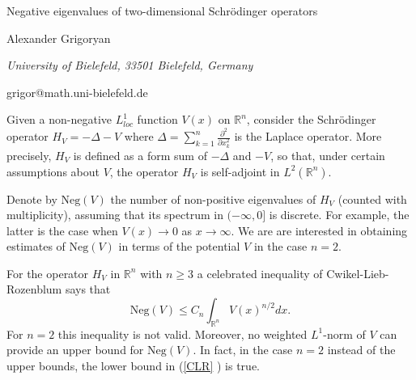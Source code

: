 \documentclass[10pt,a4paper]{article}
\begin{document}
\begin{center}
{\Large Negative eigenvalues of two-dimensional Schr\"{o}dinger operators}

\bigskip

{\sc Alexander Grigoryan}

{\small\it University of Bielefeld, 33501 Bielefeld, Germany}

{\small\rm grigor@math.uni-bielefeld.de}

\end{center}

\bigskip

Given a non-negative $L_{loc}^{1}$ function $V\left( x\right) $ on $\mathbb{R%
}^{n}$, consider the Schr\"{o}dinger operator
$
H_{V}=-\Delta -V
$
where $\Delta =\sum_{k=1}^{n}\frac{\partial ^{2}}{\partial x_{k}^{2}}$ is
the Laplace operator. More precisely, $H_{V}$ is defined as a form sum of $%
-\Delta $ and $-V$, so that, under certain assumptions about $V$, the
operator $H_{V}$ is self-adjoint in $L^{2}\left( \mathbb{R}^{n}\right) $.

Denote by $\mathrm{Neg}\left( V\right) $ the number of non-positive
eigenvalues of $H_{V}$ (counted with multiplicity), assuming that its
spectrum in $(-\infty ,0]$ is discrete. For example, the latter is the case
when $V\left( x\right) \rightarrow 0$ as $x\rightarrow \infty $. We are are
interested in obtaining estimates of $\mathrm{Neg}\left( V\right) $ in terms
of the potential $V$ in the case $n=2.$

For the operator $H_{V}$ in $\mathbb{R}^{n}$ with $n\geq 3$ a celebrated
inequality of Cwikel-Lieb-Rozenblum says that%
\begin{equation}
\mathrm{Neg}\left( V\right) \leq C_{n}\int_{\mathbb{R}^{n}}V\left( x\right)
^{n/2}dx.  \label{CLR}
\end{equation}%
For $n=2$ this inequality is not valid. Moreover, no weighted $L^{1}$-norm
of $V$ can provide an upper bound for $\mathrm{Neg}\left( V\right) .$ In fact,
in the case $n=2$ instead of the upper bounds, the lower bound in (\ref{CLR}%
) is true.
\end{document}
